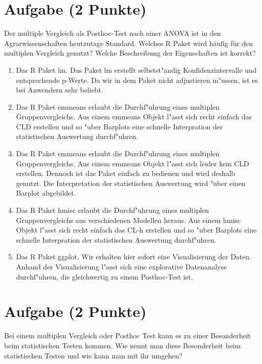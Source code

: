 \documentclass[a4paper, 9pt]{scrartcl}\usepackage[]{graphicx}\usepackage[]{xcolor}
\begin{document}
\section{Aufgabe \hfill (2 Punkte)}

Der multiple Vergleich als Posthoc-Test nach einer ANOVA ist in den
Agrarwissenschaften heutzutage Standard. Welches R Paket wird h{\"a}ufig f{\"u}r
den multiplen Vergleich genutzt? Welche Beschreibung der Eigenschaften ist korrekt?



\begin{enumerate}
\item [\textbf{A} \msquare] Das R Paket lm. Das Paket lm erstellt selbstst{"a}ndig Konfidenzintervalle und entsprechende p-Werte. Da wir in dem Paket nicht adjustieren m{"u}ssen, ist es bei Anwendern sehr beliebt.
\item [\textbf{B} \msquare] Das R Paket emmeans erlaubt die Durchf{"u}hrung eines multiplen Gruppenvergleichs. Aus einem emmeans Objekt l{"a}sst sich recht einfach das CLD erstellen und so {"u}ber Barplots eine schnelle Interpration der statistischen Auswertung durchf{"u}hren.
\item [\textbf{C} \msquare] Das R Paket emmeans erlaubt die Durchf{"u}hrung eines multiplen Gruppenvergleichs. Aus einem emmeans Objekt l{"a}sst sich leider kein CLD erstellen. Dennoch ist das Paket einfach zu bedienen und wird deshalb genutzt. Die Interpretation der statistischen Auswertung wird {"u}ber einen Barplot abgebildet.
\item [\textbf{D} \msquare] Das R Paket hmisc erlaubt die Durchf{"u}hrung eines multiplen Gruppenvergleichs aus verschiedenen Modellen heraus. Aus einem hmisc Objekt l{"a}sst sich recht einfach das CL-h erstellen und so {"u}ber Barplots eine schnelle Interpration der statistischen Auswertung durchf{"u}hren.
\item [\textbf{E} \msquare] Das R Paket ggplot. Wir erhalten hier sofort eine Visualisierung der Daten. Anhand der Visualisierung l{"a}sst sich eine explorative Datenanalyse durchf{"u}hren, die gleichwertig zu einem Posthoc-Test ist.
\end{enumerate}

\section{Aufgabe \hfill (2 Punkte)}

Bei einem multiplen Vergleich oder Posthoc Test kann es zu einer Besonderheit beim
statistischen Testen kommen. Wie nennt man diese Besonderheit beim
statistischen Testen und wie kann man mit ihr umgehen?
\end{document}
